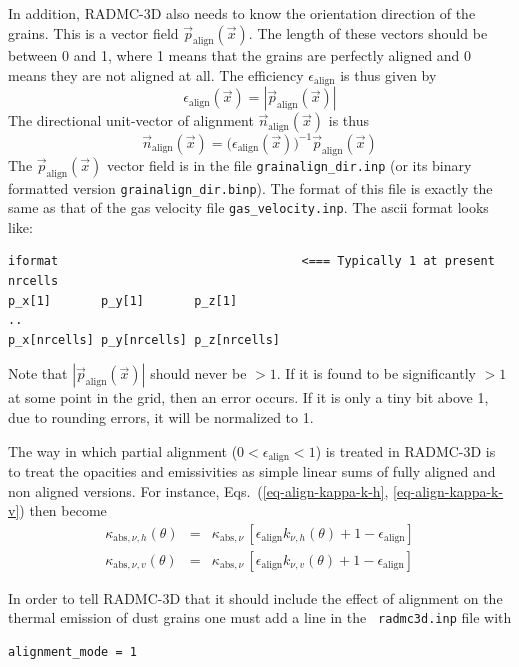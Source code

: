 \documentclass{report}
\begin{document}
In addition, RADMC-3D also needs to know the orientation direction of the
grains. This is a vector field $\vec p_{\mathrm{align}}(\vec x)$. The length
of these vectors should be between 0 and 1, where 1 means that the grains
are perfectly aligned and 0 means they are not aligned at all. The efficiency
$\epsilon_{\mathrm{align}}$ is thus given by
\begin{equation}
\epsilon_{\mathrm{align}}(\vec x) =|\vec p_{\mathrm{align}}(\vec x)|
\end{equation}
The directional unit-vector of alignment $\vec n_{\mathrm{align}}(\vec x)$
is thus
\begin{equation}
\vec n_{\mathrm{align}}(\vec x) = \big(\epsilon_{\mathrm{align}}(\vec x)\big)^{-1}\vec p_{\mathrm{align}}(\vec x)
\end{equation}
The $\vec p_{\mathrm{align}}(\vec x)$ vector field is in
the file {\small\tt grainalign\_dir.inp} (or its binary formatted version
{\small\tt grainalign\_dir.binp}). The format of this file is exactly the
same as that of the gas velocity file {\small\tt gas\_velocity.inp}. The
ascii format looks like:
{\small\begin{verbatim}
iformat                                  <=== Typically 1 at present
nrcells
p_x[1]       p_y[1]       p_z[1]
..
p_x[nrcells] p_y[nrcells] p_z[nrcells]
\end{verbatim}}
Note that $|\vec p_{\mathrm{align}}(\vec x)|$ should never be $>1$. If
it is found to be significantly $>1$ at some point in the grid, then
an error occurs. If it is only a tiny bit above 1, due to rounding
errors, it will be normalized to 1. 

The way in which partial alignment ($0<\epsilon_{\mathrm{align}}<1$) is
treated in RADMC-3D is to treat the opacities and emissivities as simple
linear sums of fully aligned and non aligned versions. For instance,
Eqs.~(\ref{eq-align-kappa-k-h}, \ref{eq-align-kappa-k-v}) then become
\begin{eqnarray}
\kappa_{\mathrm{abs},\nu,h}(\theta) &=& \kappa_{\mathrm{abs},\nu}\,[\epsilon_{\mathrm{align}}k_{\nu,h}(\theta)+1-\epsilon_{\mathrm{align}}] \\
\kappa_{\mathrm{abs},\nu,v}(\theta) &=& \kappa_{\mathrm{abs},\nu}\,[\epsilon_{\mathrm{align}}k_{\nu,v}(\theta)+1-\epsilon_{\mathrm{align}}] 
\end{eqnarray}

In order to tell RADMC-3D that it should include the effect of alignment on
the thermal emission of dust grains one must add a line in the {\small\tt
  radmc3d.inp} file with 
{\small\begin{verbatim}
alignment_mode = 1
\end{verbatim}}
\end{document}
